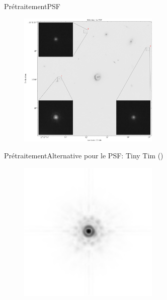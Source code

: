 \documentclass{beamer}
\begin{document}
\begin{frame}{Prétraitement}{PSF}
        \begin{figure}[H]
                \centering
                \includegraphics[width=0.6\textwidth]{psf_cutout}
        \end{figure}
\end{frame}

\begin{frame}{Prétraitement}{Alternative pour le PSF: Tiny Tim (\citet{Krist2011})}
        \begin{figure}[H]
                \centering
                \includegraphics[width=0.6\textwidth]{tiny_psf}
        \end{figure}
        
\end{frame}
\end{document}
